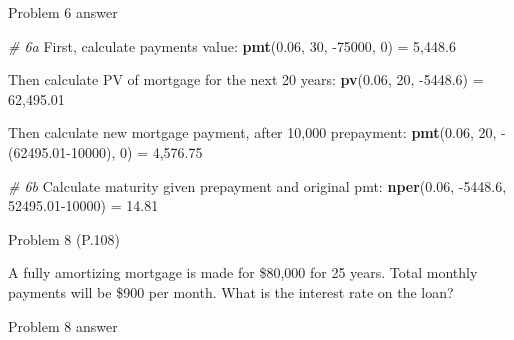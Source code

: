 \documentclass[ignorenonframetext,]{beamer}
\newenvironment{Shaded}{\begin{snugshade}}{\end{snugshade}}
\newcommand{\KeywordTok}[1]{\textcolor[rgb]{0.13,0.29,0.53}{\textbf{{#1}}}}
\newcommand{\DecValTok}[1]{\textcolor[rgb]{0.00,0.00,0.81}{{#1}}}
\newcommand{\FloatTok}[1]{\textcolor[rgb]{0.00,0.00,0.81}{{#1}}}
\newcommand{\StringTok}[1]{\textcolor[rgb]{0.31,0.60,0.02}{{#1}}}
\newcommand{\CommentTok}[1]{\textcolor[rgb]{0.56,0.35,0.01}{\textit{{#1}}}}
\newcommand{\NormalTok}[1]{{#1}}
\begin{document}
\begin{frame}[fragile]{Problem 6 answer}

\small

\begin{Shaded}
\begin{Highlighting}[]
\CommentTok{# 6a }
\NormalTok{First, calculate payments value:}\StringTok{ }
\KeywordTok{pmt}\NormalTok{(}\FloatTok{0.06}\NormalTok{, }\DecValTok{30}\NormalTok{, -}\DecValTok{75000}\NormalTok{, }\DecValTok{0}\NormalTok{) =}\StringTok{ }\DecValTok{5}\NormalTok{,}\FloatTok{448.6}

\NormalTok{Then calculate PV of mortgage for the next }\DecValTok{20} \NormalTok{years:}
\KeywordTok{pv}\NormalTok{(}\FloatTok{0.06}\NormalTok{, }\DecValTok{20}\NormalTok{, -}\FloatTok{5448.6}\NormalTok{) =}\StringTok{ }\DecValTok{62}\NormalTok{,}\FloatTok{495.01}

\NormalTok{Then calculate new mortgage payment, after }\DecValTok{10}\NormalTok{,}\DecValTok{000} \NormalTok{prepayment:}
\KeywordTok{pmt}\NormalTok{(}\FloatTok{0.06}\NormalTok{, }\DecValTok{20}\NormalTok{, -(}\FloatTok{62495.01}\DecValTok{-10000}\NormalTok{), }\DecValTok{0}\NormalTok{) =}\StringTok{ }\DecValTok{4}\NormalTok{,}\FloatTok{576.75}


\CommentTok{# 6b}
\NormalTok{Calculate maturity given prepayment and original pmt:}
\KeywordTok{nper}\NormalTok{(}\FloatTok{0.06}\NormalTok{, -}\FloatTok{5448.6}\NormalTok{, }\FloatTok{52495.01}\DecValTok{-10000}\NormalTok{) =}\StringTok{ }\FloatTok{14.81}
\end{Highlighting}
\end{Shaded}

\normalsize

\end{frame}

\begin{frame}{Problem 8 (P.108)}

A fully amortizing mortgage is made for \$80,000 for 25 years. Total
monthly payments will be \$900 per month. What is the interest rate on
the loan?

\end{frame}

\begin{frame}[fragile]{Problem 8 answer}

\begin{Shaded}
\end{Shaded}

\end{frame}
\end{document}

